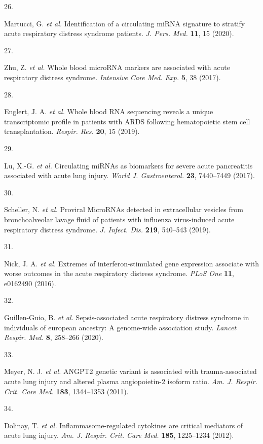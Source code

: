 \documentclass[
  11,
  a4paper,
]{article}
\newlength{\cslhangindent}
\newlength{\csllabelwidth}
\newenvironment{CSLReferences}[2] %
 {\begin{list}{}{%
  \setlength{\itemindent}{0pt}
  \setlength{\leftmargin}{0pt}
  \setlength{\parsep}{0pt}
  \ifodd #1
   \setlength{\leftmargin}{\cslhangindent}
   \setlength{\itemindent}{-1\cslhangindent}
  \fi
  \setlength{\itemsep}{#2\baselineskip}}}
 {\end{list}}
\newcommand{\CSLLeftMargin}[1]{\parbox[t]{\csllabelwidth}{\strut#1\strut}}
\newcommand{\CSLRightInline}[1]{\parbox[t]{\linewidth - \csllabelwidth}{\strut#1\strut}}
\begin{document}
\begin{CSLReferences}{0}{0}
\CSLLeftMargin{26. }%
\CSLRightInline{Martucci, G. \emph{et al.} Identification of a
circulating {miRNA} signature to stratify acute respiratory distress
syndrome patients. \emph{J. Pers. Med.} \textbf{11}, 15 (2020).}

\CSLLeftMargin{27. }%
\CSLRightInline{Zhu, Z. \emph{et al.} Whole blood {microRNA} markers are
associated with acute respiratory distress syndrome. \emph{Intensive
Care Med. Exp.} \textbf{5}, 38 (2017).}

\CSLLeftMargin{28. }%
\CSLRightInline{Englert, J. A. \emph{et al.} Whole blood {RNA}
sequencing reveals a unique transcriptomic profile in patients with
{ARDS} following hematopoietic stem cell transplantation. \emph{Respir.
Res.} \textbf{20}, 15 (2019).}

\CSLLeftMargin{29. }%
\CSLRightInline{Lu, X.-G. \emph{et al.} Circulating {miRNAs} as
biomarkers for severe acute pancreatitis associated with acute lung
injury. \emph{World J. Gastroenterol.} \textbf{23}, 7440--7449 (2017).}

\CSLLeftMargin{30. }%
\CSLRightInline{Scheller, N. \emph{et al.} Proviral {MicroRNAs} detected
in extracellular vesicles from bronchoalveolar lavage fluid of patients
with influenza virus-induced acute respiratory distress syndrome.
\emph{J. Infect. Dis.} \textbf{219}, 540--543 (2019).}

\CSLLeftMargin{31. }%
\CSLRightInline{Nick, J. A. \emph{et al.} Extremes of
interferon-stimulated gene expression associate with worse outcomes in
the acute respiratory distress syndrome. \emph{PLoS One} \textbf{11},
e0162490 (2016).}

\CSLLeftMargin{32. }%
\CSLRightInline{Guillen-Guio, B. \emph{et al.} Sepsis-associated acute
respiratory distress syndrome in individuals of european ancestry: A
genome-wide association study. \emph{Lancet Respir. Med.} \textbf{8},
258--266 (2020).}

\CSLLeftMargin{33. }%
\CSLRightInline{Meyer, N. J. \emph{et al.} {ANGPT2} genetic variant is
associated with trauma-associated acute lung injury and altered plasma
angiopoietin-2 isoform ratio. \emph{Am. J. Respir. Crit. Care Med.}
\textbf{183}, 1344--1353 (2011).}

\CSLLeftMargin{34. }%
\CSLRightInline{Dolinay, T. \emph{et al.} Inflammasome-regulated
cytokines are critical mediators of acute lung injury. \emph{Am. J.
Respir. Crit. Care Med.} \textbf{185}, 1225--1234 (2012).}


\end{CSLReferences}
\end{document}
